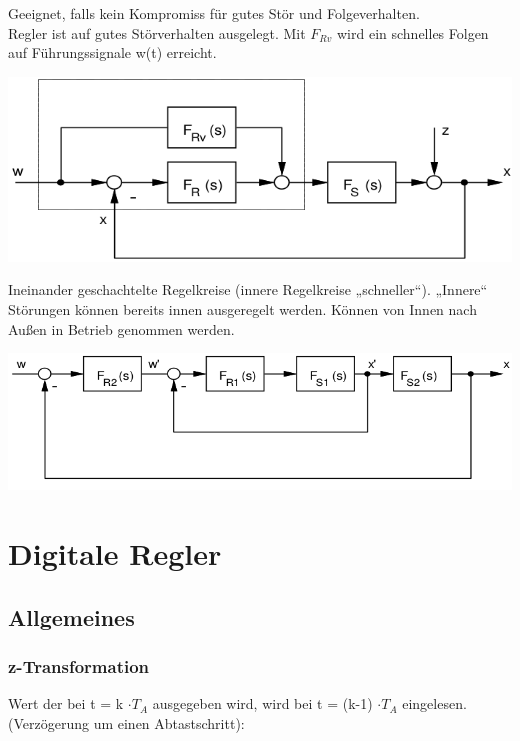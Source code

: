 \documentclass[10pt,a4paper]{article}
\begin{document}
\begin{mdframed}[style=exercise, frametitle=Vorsteuerung:]
	Geeignet, falls kein Kompromiss für gutes Stör und Folgeverhalten.\\
	Regler ist auf gutes Störverhalten ausgelegt. Mit $F_{Rv}$ wird ein schnelles Folgen
	auf Führungssignale w(t) erreicht.
\end{mdframed}

\includegraphics[width=0.9\columnwidth]{Figures/Vorsteuerung.png}


\begin{mdframed}[style=exercise, frametitle=Kaskadenregelung:]
	Ineinander geschachtelte Regelkreise (innere Regelkreise „schneller“). „Innere“
	Störungen können bereits innen ausgeregelt werden. Können von Innen nach Außen in Betrieb genommen werden.
\end{mdframed}

\includegraphics[width=0.9\columnwidth]{Figures/Kaskadenregelung.png}

\newpage
\section{Digitale Regler}
\subsection{Allgemeines}
\subsubsection{z-Transformation}

Wert der bei t = k $\cdot T_A$ ausgegeben wird, wird bei t = (k-1) $\cdot T_A$
eingelesen. (Verzögerung um einen Abtastschritt):
\end{document}

